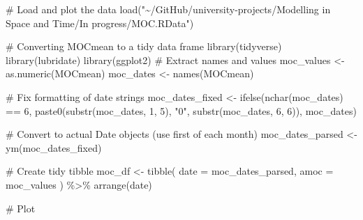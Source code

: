 \documentclass[
  11pt,
]{article}
\newenvironment{Shaded}{\begin{snugshade}}{\end{snugshade}}
\newcommand{\AttributeTok}[1]{\textcolor[rgb]{0.40,0.45,0.13}{#1}}
\newcommand{\CommentTok}[1]{\textcolor[rgb]{0.37,0.37,0.37}{#1}}
\newcommand{\DecValTok}[1]{\textcolor[rgb]{0.68,0.00,0.00}{#1}}
\newcommand{\FunctionTok}[1]{\textcolor[rgb]{0.28,0.35,0.67}{#1}}
\newcommand{\NormalTok}[1]{\textcolor[rgb]{0.00,0.23,0.31}{#1}}
\newcommand{\OtherTok}[1]{\textcolor[rgb]{0.00,0.23,0.31}{#1}}
\newcommand{\SpecialCharTok}[1]{\textcolor[rgb]{0.37,0.37,0.37}{#1}}
\newcommand{\StringTok}[1]{\textcolor[rgb]{0.13,0.47,0.30}{#1}}
\begin{document}
\begin{Shaded}
\begin{Highlighting}[]
\CommentTok{\# Load and plot the data}
\FunctionTok{load}\NormalTok{(}\StringTok{"\textasciitilde{}/GitHub/university{-}projects/Modelling in Space and Time/In progress/MOC.RData"}\NormalTok{)}


\CommentTok{\# Converting MOCmean to a tidy data frame}
\FunctionTok{library}\NormalTok{(tidyverse)}
\FunctionTok{library}\NormalTok{(lubridate)}
\FunctionTok{library}\NormalTok{(ggplot2)}
\CommentTok{\# Extract names and values}
\NormalTok{moc\_values }\OtherTok{\textless{}{-}} \FunctionTok{as.numeric}\NormalTok{(MOCmean)}
\NormalTok{moc\_dates }\OtherTok{\textless{}{-}} \FunctionTok{names}\NormalTok{(MOCmean)}

\CommentTok{\# Fix formatting of date strings    }
\NormalTok{moc\_dates\_fixed }\OtherTok{\textless{}{-}} \FunctionTok{ifelse}\NormalTok{(}\FunctionTok{nchar}\NormalTok{(moc\_dates) }\SpecialCharTok{==} \DecValTok{6}\NormalTok{,}
                          \FunctionTok{paste0}\NormalTok{(}\FunctionTok{substr}\NormalTok{(moc\_dates, }\DecValTok{1}\NormalTok{, }\DecValTok{5}\NormalTok{), }\StringTok{"0"}\NormalTok{, }\FunctionTok{substr}\NormalTok{(moc\_dates, }\DecValTok{6}\NormalTok{, }\DecValTok{6}\NormalTok{)),}
\NormalTok{                          moc\_dates)}

\CommentTok{\# Convert to actual Date objects (use first of each month)}
\NormalTok{moc\_dates\_parsed }\OtherTok{\textless{}{-}} \FunctionTok{ym}\NormalTok{(moc\_dates\_fixed)}

\CommentTok{\# Create tidy tibble}
\NormalTok{moc\_df }\OtherTok{\textless{}{-}} \FunctionTok{tibble}\NormalTok{(}
  \AttributeTok{date =}\NormalTok{ moc\_dates\_parsed,}
  \AttributeTok{amoc =}\NormalTok{ moc\_values}
\NormalTok{) }\SpecialCharTok{\%\textgreater{}\%} \FunctionTok{arrange}\NormalTok{(date)}

\CommentTok{\# Plot}


\end{Highlighting}
\end{Shaded}
\end{document}
